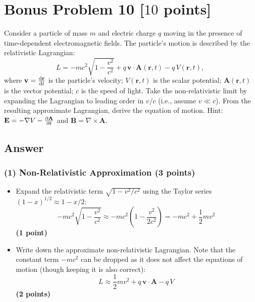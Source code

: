 \documentclass[11pt, a4paper]{article} %
\begin{document}
\newpage
\section*{Bonus Problem 10 [$10$ points]}
Consider a particle of mass $m$ and electric charge $q$ moving in the presence of time-dependent electromagnetic fields. The particle's motion is described by the relativistic Lagrangian:
\[
L = -mc^2\sqrt{1 - \frac{v^2}{c^2}} + q\, \mathbf{v} \cdot \mathbf{A}(\mathbf{r}, t) - q\, V(\mathbf{r}, t),
\]
where $\mathbf{v} = \dv{\mathbf{r}}{t}$ is the particle's velocity; $V(\mathbf{r}, t)$ is the scalar potential; $\mathbf{A}(\mathbf{r}, t)$ is the vector potential; $c$ is the speed of light. Take the non-relativistic limit by expanding the Lagrangian to leading order in $v/c$ (i.e., assume $v \ll c$). From the resulting approximate Lagrangian, derive the equation of motion.
Hint: $\mathbf{E} = -\nabla V - \pdv{\mathbf{A}}{t}$ and $\mathbf{B} = \nabla \times \mathbf{A}$.

\subsection*{Answer}
\subsubsection*{(1) Non-Relativistic Approximation (3 points)}
\begin{itemize}
    \item Expand the relativistic term $\sqrt{1 - v^2/c^2}$ using the Taylor series $(1-x)^{1/2} \approx 1 - x/2$:
    \[
    -mc^2\sqrt{1 - \frac{v^2}{c^2}} \approx -mc^2\left(1 - \frac{v^2}{2c^2}\right) = -mc^2 + \frac{1}{2}mv^2
    \]
    \hfill \textbf{(1 point)}
    \item Write down the approximate non-relativistic Lagrangian. Note that the constant term $-mc^2$ can be dropped as it does not affect the equations of motion (though keeping it is also correct):
    \[
    L \approx \frac{1}{2}mv^2 + q\, \mathbf{v} \cdot \mathbf{A} - q\, V
    \]
    \hfill \textbf{(2 points)} \\
\end{itemize}
\end{document}
